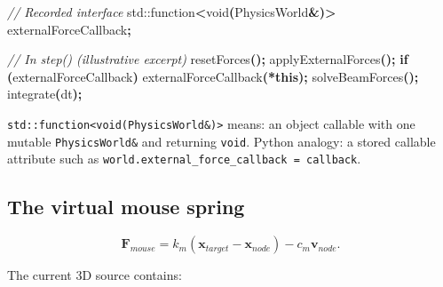 \documentclass[
  10pt,
  a4paper,
]{article}
\newenvironment{Shaded}{\begin{snugshade}}{\end{snugshade}}
\newcommand{\BuiltInTok}[1]{#1}
\newcommand{\CommentTok}[1]{\textcolor[rgb]{0.56,0.35,0.01}{\textit{#1}}}
\newcommand{\ControlFlowTok}[1]{\textcolor[rgb]{0.13,0.29,0.53}{\textbf{#1}}}
\newcommand{\DataTypeTok}[1]{\textcolor[rgb]{0.13,0.29,0.53}{#1}}
\newcommand{\KeywordTok}[1]{\textcolor[rgb]{0.13,0.29,0.53}{\textbf{#1}}}
\newcommand{\NormalTok}[1]{#1}
\newcommand{\OperatorTok}[1]{\textcolor[rgb]{0.81,0.36,0.00}{\textbf{#1}}}
\begin{document}
\begin{Shaded}
\begin{Highlighting}[]
\CommentTok{// Recorded interface}
\BuiltInTok{std::}\NormalTok{function}\OperatorTok{\textless{}}\DataTypeTok{void}\OperatorTok{(}\NormalTok{PhysicsWorld}\OperatorTok{\&)\textgreater{}}\NormalTok{ externalForceCallback}\OperatorTok{;}

\CommentTok{// In step() (illustrative excerpt)}
\NormalTok{resetForces}\OperatorTok{();}
\NormalTok{applyExternalForces}\OperatorTok{();}
\ControlFlowTok{if} \OperatorTok{(}\NormalTok{externalForceCallback}\OperatorTok{)}\NormalTok{ externalForceCallback}\OperatorTok{(*}\KeywordTok{this}\OperatorTok{);}
\NormalTok{solveBeamForces}\OperatorTok{();}
\NormalTok{integrate}\OperatorTok{(}\NormalTok{dt}\OperatorTok{);}
\end{Highlighting}
\end{Shaded}

\texttt{std::function\textless{}void(PhysicsWorld\&)\textgreater{}}
means: an object callable with one mutable \texttt{PhysicsWorld\&} and
returning \texttt{void}. Python analogy: a stored callable attribute
such as \texttt{world.external\_force\_callback\ =\ callback}.

\subsection{The virtual mouse spring}\label{the-virtual-mouse-spring}

\[\boxed{\mathbf F_{mouse}=k_m(\mathbf x_{target}-\mathbf x_{node})-c_m\mathbf v_{node}}.\]

The current 3D source contains:
\end{document}
